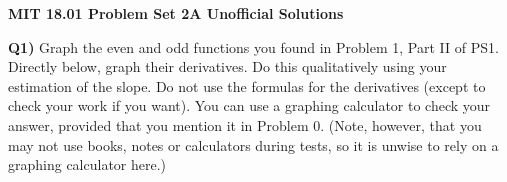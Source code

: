 \documentclass[9pt]{article}
\begin{document}
\begin{center}
  \large\textbf{MIT 18.01 Problem Set 2A Unofficial Solutions}
\end{center}

\begin{tcolorbox}
  \textbf{Q1)} Graph the even and odd functions you found in Problem 1, Part II of PS1. Directly below, graph their derivatives. Do this qualitatively using your estimation of the slope. Do not use the formulas for the derivatives (except to check your work if you want). You can use a graphing calculator to check your answer, provided that you mention it in Problem 0. (Note, however, that you may not use books, notes or calculators during tests, so it is unwise to rely on a graphing calculator here.)
\end{tcolorbox}
\end{document}
